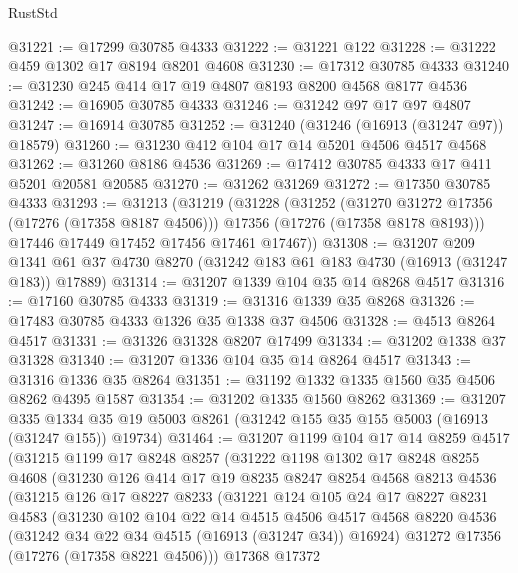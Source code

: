\begin{lexlean}{RustStd}
\begin{coremodule}
@31221 := @17299 @30785 @4333
@31222 := @31221 @122
@31228 := @31222 @459 @1302 @17 @8194 @8201 @4608
@31230 := @17312 @30785 @4333
@31240 := @31230 @245 @414 @17 @19 @4807 @8193 @8200 @4568 @8177 @4536
@31242 := @16905 @30785 @4333
@31246 := @31242 @97 @17 @97 @4807
@31247 := @16914 @30785
@31252 := @31240 (@31246 (@16913 (@31247 @97)) @18579)
@31260 := @31230 @412 @104 @17 @14 @5201 @4506 @4517 @4568
@31262 := @31260 @8186 @4536
@31269 := @17412 @30785 @4333 @17 @411 @5201 @20581 @20585
@31270 := @31262 @31269
@31272 := @17350 @30785 @4333
@31293 := @31213
    (@31219
      (@31228
        (@31252
          (@31270 @31272 @17356 (@17276 (@17358 @8187 @4506)))
          @17356
          (@17276 (@17358 @8178 @8193)))
        @17446
        @17449
        @17452
        @17456
        @17461
        @17467))
@31308 := @31207
    @209
    @1341
    @61
    @37
    @4730
    @8270
    (@31242 @183 @61 @183 @4730 (@16913 (@31247 @183)) @17889)
@31314 := @31207 @1339 @104 @35 @14 @8268 @4517
@31316 := @17160 @30785 @4333
@31319 := @31316 @1339 @35 @8268
@31326 := @17483 @30785 @4333 @1326 @35 @1338 @37 @4506
@31328 := @4513 @8264 @4517
@31331 := @31326 @31328 @8207 @17499
@31334 := @31202 @1338 @37 @31328
@31340 := @31207 @1336 @104 @35 @14 @8264 @4517
@31343 := @31316 @1336 @35 @8264
@31351 := @31192 @1332 @1335 @1560 @35 @4506 @8262 @4395 @1587
@31354 := @31202 @1335 @1560 @8262
@31369 := @31207
    @335
    @1334
    @35
    @19
    @5003
    @8261
    (@31242 @155 @35 @155 @5003 (@16913 (@31247 @155)) @19734)
@31464 := @31207
    @1199
    @104
    @17
    @14
    @8259
    @4517
    (@31215
      @1199
      @17
      @8248
      @8257
      (@31222
        @1198
        @1302
        @17
        @8248
        @8255
        @4608
        (@31230
          @126
          @414
          @17
          @19
          @8235
          @8247
          @8254
          @4568
          @8213
          @4536
          (@31215
            @126
            @17
            @8227
            @8233
            (@31221
              @124
              @105
              @24
              @17
              @8227
              @8231
              @4583
              (@31230
                @102
                @104
                @22
                @14
                @4515
                @4506
                @4517
                @4568
                @8220
                @4536
                (@31242 @34 @22 @34 @4515 (@16913 (@31247 @34)) @16924)
                @31272
                @17356
                (@17276 (@17358 @8221 @4506)))
              @17368
              @17372

\end{coremodule}
\end{lexlean}
